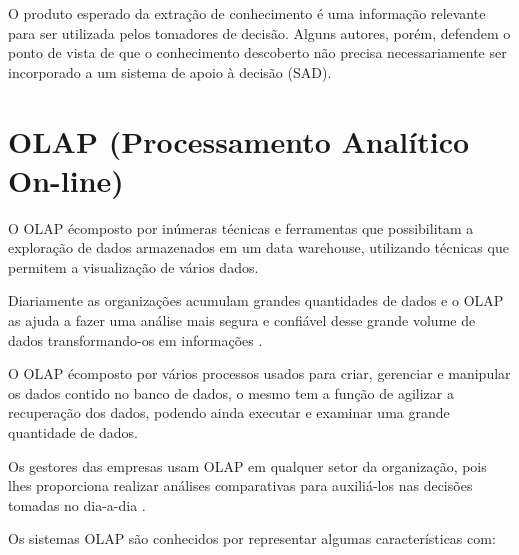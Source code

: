 O produto esperado da extra\c{c}\~{a}o de conhecimento \'{e} uma informa\c{c}\~{a}o relevante para ser utilizada pelos tomadores de decis\~{a}o. Alguns autores, por\'{e}m, defendem o ponto de vista de que o conhecimento descoberto n\~{a}o precisa necessariamente ser incorporado a um sistema de apoio \`{a} decis\~{a}o (SAD).

\section{OLAP (Processamento Anal\'{i}tico On-line)}

O OLAP \'{e}composto por inúmeras t\'{e}cnicas e ferramentas que possibilitam a explora\c{c}\~{a}o de dados armazenados em um data warehouse, utilizando t\'{e}cnicas que permitem a visualiza\c{c}\~{a}o de v\'{a}rios dados. 

Diariamente as organiza\c{c}\~{o}es acumulam grandes quantidades de dados e o OLAP as ajuda a fazer uma an\'{a}lise mais segura e confi\'{a}vel desse grande volume de dados transformando-os em informa\c{c}\~{o}es \cite{olap-jacobson-misner-2007}.

O OLAP \'{e}composto por v\'{a}rios processos usados para criar, gerenciar e manipular os dados contido no banco de dados, o mesmo tem a fun\c{c}\~{a}o de agilizar a recupera\c{c}\~{a}o dos dados, podendo ainda executar e examinar uma grande quantidade de dados. 

Os gestores das empresas usam OLAP em qualquer setor da organiza\c{c}\~{a}o, pois lhes proporciona realizar an\'{a}lises comparativas para auxili\'{a}-los nas decis\~{o}es tomadas no dia-a-dia  \cite{olap-jacobson-misner-2007}.

Os sistemas OLAP s\~{a}o conhecidos por representar algumas caracter\'{i}sticas com:

